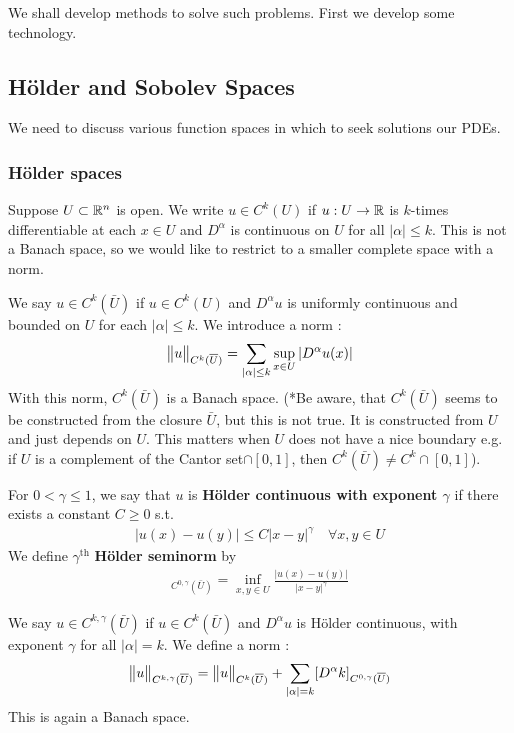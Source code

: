 \documentclass[10pt,a4paper]{report}
\begin{document}
We shall develop methods to solve such problems. First we develop some technology.

\subsection*{H\"{o}lder and Sobolev Spaces}

We need to discuss various function spaces in which to seek solutions our PDEs.

\subsubsection*{H\"{o}lder spaces}

Suppose $U\subset \mathbb{R}^n$ is open. We write $u\in C^k(U)$ if $u:U\rightarrow \mathbb{R}$ is $k$-times differentiable at each $x\in U$ and $D^{\alpha}$ is continuous on $U$ for all $|\alpha| \leq k$. This is not a Banach space, so we would like to restrict to a smaller complete space with a norm.

\quad We say $u\in C^k(\bar{U})$ if $u\in C^k (U)$ and $D^{\alpha}u$ is uniformly continuous and bounded on $U$ for each $|\alpha| \leq k$. We introduce a norm :
\begin{align*}
\bigl\lVert u\bigr\rVert_{C^k(\overline{U})} = \sum_{|\alpha|\leq k} \sup_{x\in U} |D^{\alpha}u(x)|
\end{align*}
With this norm, $C^k(\bar{U})$ is a Banach space. (*Be aware, that $C^k(\bar{U})$ seems to be constructed from the closure $\bar{U}$, but this is not true. It is constructed from $U$ and just depends on $U$. This matters when $U$ does not have a nice boundary e.g. if $U$ is a complement of the Cantor set$\cap [0,1]$, then $C^{k}(\bar{U})\neq C^{k} \cap [0,1]$).

\quad For $0< \gamma \leq 1$, we say that $u$ is \textbf{H\"{o}lder continuous with exponent $\gamma$} if there exists a constant $C\geq 0$ s.t.
\begin{align*}
|u(x)-u(y)|\leq C|x-y|^{\gamma} \quad \forall x,y \in U
\end{align*}
We define $\gamma^{\text{th}}$ \textbf{H\"{o}lder seminorm} by
\begin{align*}
[u]_{C^{0,\gamma}(\bar{U})} = \inf_{x,y\in U} \frac{|u(x)-u(y)|}{|x-y|^{\gamma}}
\end{align*}

\quad We say $u\in C^{k,\gamma}(\bar{U})$ if $u\in C^k(\bar{U})$ and $D^{\alpha}u$ is H\"{o}lder continuous, with exponent $\gamma$ for all $|\alpha|=k$. We define a norm : 
\begin{align*}
\bigl\lVert u\bigr\rVert_{C^{k,\gamma}(\overline{U})} = \bigl\lVert u\bigr\rVert_{C^k(\overline{U})} + \sum_{|\alpha|=k} [D^{\alpha} k]_{C^{0,\gamma}(\overline{U})}
\end{align*}
This is again a Banach space.
\end{document}
